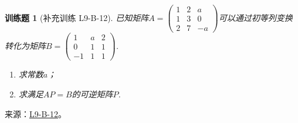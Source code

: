 \documentclass[12pt,fontset=fandol]{ctexart}
\newtheorem{exercise}{训练题}[section]
\begin{document}
\begin{exercise}[补充训练 L9-B-12]\label{prob:L9-B-12}
已知矩阵$A=\begin{pmatrix}1 & 2 & a  \\
            1 & 3 & 0  \\
            2 & 7 & -a\end{pmatrix}$可以通过初等列变换转化为矩阵$B=\begin{pmatrix}1  & a & 2 \\
            0  & 1 & 1 \\
            -1 & 1 & 1\end{pmatrix}$.
        \begin{enumerate}
            \item 求常数$a$；
            \item 求满足$AP=B$的可逆矩阵$P$.
        \end{enumerate}
\end{exercise}
\noindent 来源：\href{https://github.com/yhwu-is/Linear-Algebra-Left-Undone/blob/new/%E8%AE%B2%E4%B9%89/%E4%B8%93%E9%A2%98/9%20%E7%9F%A9%E9%98%B5%E8%BF%90%E7%AE%97%E8%BF%9B%E9%98%B6.tex}{L9-B-12}。
\end{document}
